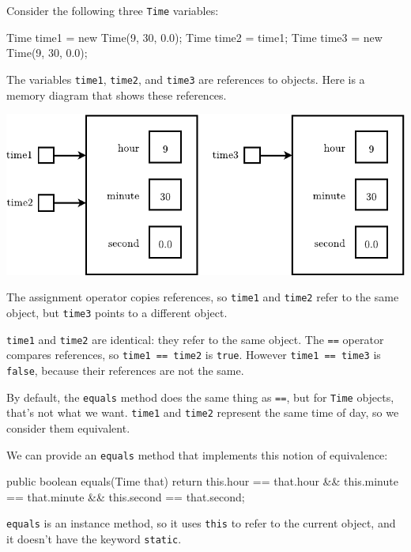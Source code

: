 \documentclass[12pt]{book}
\theoremstyle{exercise}
\newcommand{\java}[1]{\verb"#1"}
\newcommand{\java}[1]{\lstinline{#1}} %
\begin{document}
Consider the following three \java{Time} variables:

\begin{code}
    Time time1 = new Time(9, 30, 0.0);
    Time time2 = time1;
    Time time3 = new Time(9, 30, 0.0);
\end{code}

The variables \java{time1}, \java{time2}, and \java{time3} are references to objects.
Here is a memory diagram that shows these references.

\begin{center}
\includegraphics{figs/time2.pdf}
\end{center}

The assignment operator copies references, so \java{time1} and \java{time2} refer to the same object, but \java{time3} points to a different object.

\java{time1} and \java{time2} are identical: they refer to the same object.
The \java{==} operator compares references, so \java{time1 == time2} is \java{true}.
However \java{time1 == time3} is \java{false}, because their references are not the same.

By default, the \java{equals} method does the same thing as \java{==}, but for \java{Time} objects, that's not what we want.
\java{time1} and \java{time2} represent the same time of day, so we consider them equivalent.

We can provide an \java{equals} method that implements this notion of equivalence:

\begin{code}
    public boolean equals(Time that) {
        return this.hour == that.hour
            && this.minute == that.minute
            && this.second == that.second;
    }
\end{code}

\java{equals} is an instance method, so it uses \java{this} to refer to the current object, and it doesn't have the keyword \java{static}.
\end{document}
